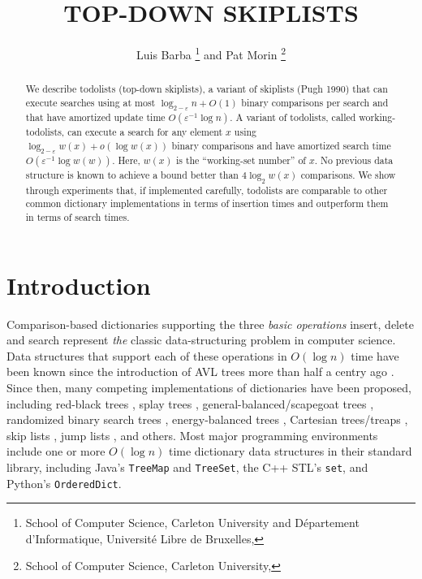 \documentclass{patmorin}
\title{\MakeUppercase{Top-Down Skiplists}}
\author{Luis Barba%
     \thanks{School of Computer Science, Carleton University
             and Département d'Informatique, 
             Université Libre de Bruxelles,
             \email{lbarbafl@ulb.ac.be}}\enspace
     and Pat Morin%
     \thanks{School of Computer Science, Carleton University,
             \email{morin@scs.carleton.ca}}}
\newcommand{\eps}{\varepsilon}
\begin{document}
\begin{titlepage}
\maketitle

\begin{abstract}
  We describe todolists (top-down skiplists), a variant of skiplists
  (Pugh 1990) that can execute searches using at most $\log_{2-\eps} n +
  O(1)$ binary comparisons per search and that have amortized update time
  $O(\eps^{-1}\log n)$. A variant of todolists, called working-todolists,
  can execute a search for any element $x$ using $\log_{2-\eps} w(x)
  + o(\log w(x))$ binary comparisons and have amortized search time
  $O(\eps^{-1}\log w(w))$. Here, $w(x)$ is the ``working-set number'' of
  $x$. No previous data structure is known to achieve a bound better
  than $4\log_2 w(x)$ comparisons. We show through experiments that,
  if implemented carefully, todolists are comparable to other common
  dictionary implementations in terms of insertion times and outperform
  them in terms of search times.
\end{abstract}

\end{titlepage}

\section{Introduction}

Comparison-based dictionaries supporting the three \emph{basic
operations} insert, delete and search represent \emph{the} classic
data-structuring problem in computer science.  Data structures that
support each of these operations in $O(\log n)$ time have been known
since the introduction of AVL trees more than half a centry ago
\cite{adelson-velskii.landis:algorithm}.  Since then, many competing
implementations of dictionaries have been proposed, including
red-black trees \cite{guibas.sedgewick:dichromatic}, splay trees
\cite{sleator.tarjan:self-adjusting}, general-balanced/scapegoat
trees \cite{andersson:general,galperin.rivest:scapegoat},
randomized binary search trees \cite{martinez:randomized},
energy-balanced trees \cite{goodrich:competitive}, Cartesian trees/treaps
\cite{aragon.seidel:randomized,vuillemin:unifying}, skip lists
\cite{pugh:skip}, jump lists \cite{bronnimann.cazals.ea:randomized},
and others.  Most major programming environments include one or more
$O(\log n)$ time dictionary data structures in their standard library,
including Java's \texttt{TreeMap} and \texttt{TreeSet}, the C++ STL's
\texttt{set}, and Python's \texttt{OrderedDict}.
\end{document}
